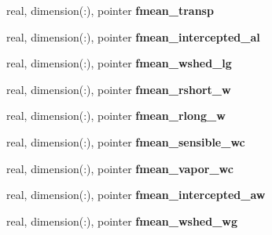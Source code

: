 \begin{DoxyCompactItemize}
\item 
\hypertarget{structed__state__vars_1_1edtype_a925d6433c41708117b659415606b5fef}{
real, dimension(:), pointer {\bfseries fmean\_\-transp}}
\label{structed__state__vars_1_1edtype_a925d6433c41708117b659415606b5fef}

\item 
\hypertarget{structed__state__vars_1_1edtype_a8bf075e70c22487f16e8d62a0ccc8d87}{
real, dimension(:), pointer {\bfseries fmean\_\-intercepted\_\-al}}
\label{structed__state__vars_1_1edtype_a8bf075e70c22487f16e8d62a0ccc8d87}

\item 
\hypertarget{structed__state__vars_1_1edtype_a3757f609d0a830d92cad3b2f9a3aa50a}{
real, dimension(:), pointer {\bfseries fmean\_\-wshed\_\-lg}}
\label{structed__state__vars_1_1edtype_a3757f609d0a830d92cad3b2f9a3aa50a}

\item 
\hypertarget{structed__state__vars_1_1edtype_ae12911b9529822af93a0d624c1fc5f20}{
real, dimension(:), pointer {\bfseries fmean\_\-rshort\_\-w}}
\label{structed__state__vars_1_1edtype_ae12911b9529822af93a0d624c1fc5f20}

\item 
\hypertarget{structed__state__vars_1_1edtype_a09cc75ff4ff0d98fd2da83c04f3ca4e7}{
real, dimension(:), pointer {\bfseries fmean\_\-rlong\_\-w}}
\label{structed__state__vars_1_1edtype_a09cc75ff4ff0d98fd2da83c04f3ca4e7}

\item 
\hypertarget{structed__state__vars_1_1edtype_a247c1731c44536c6209e54027f6e2b94}{
real, dimension(:), pointer {\bfseries fmean\_\-sensible\_\-wc}}
\label{structed__state__vars_1_1edtype_a247c1731c44536c6209e54027f6e2b94}

\item 
\hypertarget{structed__state__vars_1_1edtype_a92823d801572af4b7d96a219275f1d65}{
real, dimension(:), pointer {\bfseries fmean\_\-vapor\_\-wc}}
\label{structed__state__vars_1_1edtype_a92823d801572af4b7d96a219275f1d65}

\item 
\hypertarget{structed__state__vars_1_1edtype_a76c439774dd0c4d8c783d716bde5b0fe}{
real, dimension(:), pointer {\bfseries fmean\_\-intercepted\_\-aw}}
\label{structed__state__vars_1_1edtype_a76c439774dd0c4d8c783d716bde5b0fe}

\item 
\hypertarget{structed__state__vars_1_1edtype_a5f78d84f950725d8b07f70e4b269798d}{
real, dimension(:), pointer {\bfseries fmean\_\-wshed\_\-wg}}
\label{structed__state__vars_1_1edtype_a5f78d84f950725d8b07f70e4b269798d}


\end{DoxyCompactItemize}
